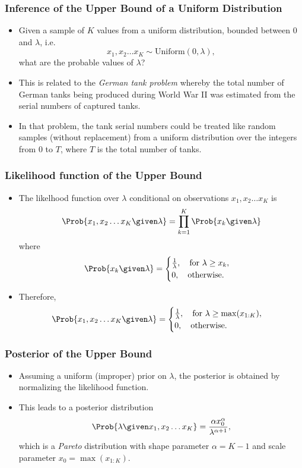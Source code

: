 \documentclass{slides}
\begin{document}
	\newcommand{\umax}{\lambda}
	\begin{frame}
		\frametitle{Inference of the Upper Bound of a Uniform Distribution}
		\begin{itemize}

			\item Given a sample of $K$ values from a uniform
				distribution, bounded between 0 and $\umax$,
				i.e.  \[x_1, x_2 \ldots x_K \sim
				\textrm{Uniform}(0, \umax),\] what are the
				probable values of $\umax$?

			\item This is related to the \emph{German tank problem}
				whereby the total number of German tanks being
				produced during World War II was estimated from
				the serial numbers of captured tanks.

			\item In that problem, the tank serial numbers could be
				treated like random samples (without
				replacement) from a uniform distribution over
				the integers from $0$ to $T$, where $T$ is the
				total number of tanks.

		\end{itemize}
	\end{frame}

	\begin{frame}
		\frametitle{Likelihood function of the Upper Bound}
		\begin{itemize}
			\item The likelhood function over $\umax$ conditional on observations $x_1, x_2 \ldots x_K$ is
				\[
					\Prob{x_1, x_2 \ldots x_K \given \umax} = \prod_{k=1}^K \Prob{x_k \given \umax}
					\]
				where
				\[\Prob{x_k \given \umax} 
				= \begin{cases}
					\frac{1}{\umax},\quad\text{for $\umax \geq x_k$},\\
					0, \quad\text{otherwise.}
				\end{cases}\]
			\item Therefore, \[
					\Prob{x_1, x_2 \ldots x_K \given \umax} 
					= \begin{cases}
						\frac{1}{\umax},\quad\text{for $\umax \geq \max(x_{1:K})$},\\
					0, \quad\text{otherwise.}
					\end{cases}\]
		\end{itemize}
	\end{frame}

	\begin{frame}
		\frametitle{Posterior of the Upper Bound}
		\begin{itemize}
			\item Assuming a uniform (improper) prior on $\umax$, the posterior is obtained by normalizing the likelihood function.
			\item This leads to a posterior distribution 
				\[
					\Prob{\umax \given x_1, x_2 \ldots x_K} = \frac{\alpha x_0^\alpha}{\umax^{\alpha+1}},
				\]
				which is a \emph{Pareto} distribution with shape parameter $\alpha=K-1$ and scale parameter $x_0 =  \max(x_{1:K})$.
		\end{itemize}
	\end{frame}
\end{document}
